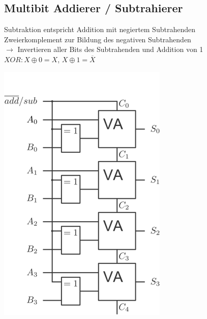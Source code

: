 \documentclass[6pt,a4paper]{scrartcl}
\begin{document}
\begin{multicols*}{3}
\subsection{Multibit Addierer / Subtrahierer}
\begin{minipage}{0.40\linewidth}
  Subtraktion entspricht Addition mit negiertem Subtrahenden\\
  Zweierkomplement zur Bildung des negativen Subtrahenden\\
  $\rightarrow$ Invertieren aller Bits des Subtrahenden und Addition von 1\\
  $\mathit{XOR}: X \oplus 0 = X$, $X \oplus 1 = \overline{X}$
\end{minipage}
\begin{minipage}{0.40\linewidth}
  \includegraphics[width=\linewidth,angle=90]{./img/ds/multibit_addierer_subtrahierer.png}
\end{minipage}



\end{multicols*}
\end{document}
